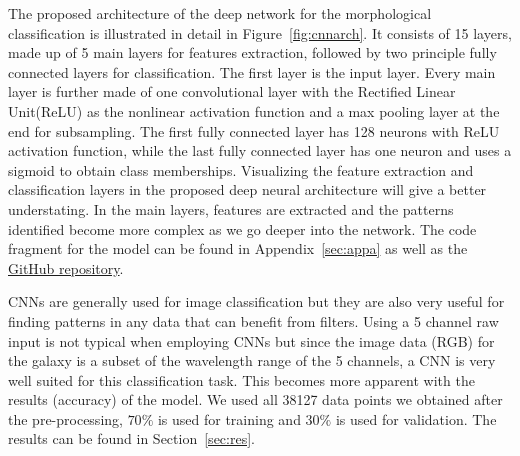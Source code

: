 The proposed architecture of the deep network for the morphological classification is illustrated in detail in Figure~\ref{fig:cnnarch}. It consists of 15 layers, made up of 5 main layers for features extraction, followed by two principle fully connected layers for classification. The first layer is the input layer. Every main layer is further made of one convolutional layer with the Rectified Linear Unit(ReLU) as the nonlinear activation function and a max pooling layer at the end for subsampling. The first fully connected layer has 128 neurons with ReLU activation function, while the last fully connected layer has one neuron and uses a sigmoid to obtain class memberships. Visualizing the feature extraction and classification layers in the proposed deep neural architecture will give a better understating. In the main layers, features are extracted and the patterns identified become more complex as we go deeper into the network. The code fragment for the model can be found in Appendix~\ref{sec:appa} as well as the \href{https://github.com/klaykulik/datascience}{GitHub repository}.

CNNs are generally used for image classification but they are also very useful for finding patterns in any data that can benefit from filters. Using a 5 channel raw input is not typical when employing CNNs but since the image data (RGB) for the galaxy is a subset of the wavelength range of the 5 channels, a CNN is very well suited for this classification task. This becomes more apparent with the results (accuracy) of the model. We used all 38127 data points we obtained after the pre-processing, $70\%$ is used for training and $30\%$ is used for validation. The results can be found in Section~\ref{sec:res}.